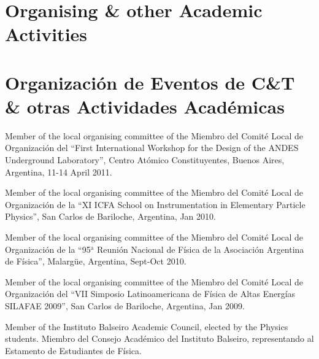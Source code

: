 \ifeng
\section*{Organising \& other Academic Activities}
\else
\section*{Organización de Eventos de C\&T \& otras Actividades Académicas}
\fi

\ifeng
Member of the local organising committee of the 
\else
Miembro del Comité Local de Organización del 
\fi
``First International Workshop for the Design of the ANDES Underground Laboratory'', Centro Atómico Constituyentes, Buenos Aires, Argentina, 11-14 April 2011.

\ifeng
Member of the local organising committee of the 
\else
Miembro del Comité Local de Organización de la 
\fi
``XI ICFA School on Instrumentation in Elementary Particle Physics'', San Carlos de Bariloche, Argentina, Jan 2010.

\ifeng
Member of the local organising committee of the 
\else
Miembro del Comité Local de Organización de la 
\fi
``95$^{\mathrm{a}}$ Reunión Nacional de Física de la Asociación Argentina de Física'', Malargüe, Argentina, Sept-Oct 2010.

\ifeng
Member of the local organising committee of the 
\else
Miembro del Comité Local de Organización del
\fi
``VII Simposio Latinoamericana de Física de Altas Energías SILAFAE 2009'', San Carlos de Bariloche, Argentina, Jan 2009.

\ifeng
Member of the Instituto Balseiro Academic Council, elected by the Physics students.
\else
Miembro del Consejo Académico del Instituto Balseiro, representando al Estamento de Estudiantes de Física.
\fi
